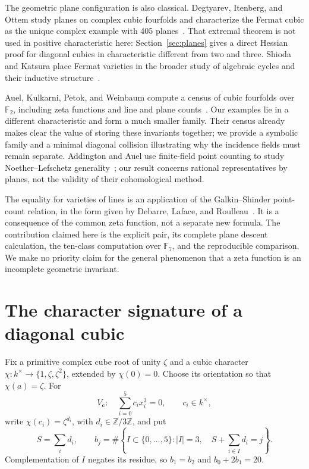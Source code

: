 \documentclass[11pt]{article}
\theoremstyle{remark}\newtheorem{remark}[theorem]{Remark}
\newcommand{\F}{\mathbb F}\newcommand{\PP}{\mathbb P}\newcommand{\Z}{\mathbb Z}
\begin{document}
The geometric plane configuration is also classical. Degtyarev, Itenberg, and Ottem study planes on complex cubic fourfolds and characterize the Fermat cubic as the unique complex example with 405 planes~\cite{dio}. That extremal theorem is not used in positive characteristic here: Section~\ref{sec:planes} gives a direct Hessian proof for diagonal cubics in characteristic different from two and three. Shioda and Katsura place Fermat varieties in the broader study of algebraic cycles and their inductive structure~\cite{sk}.

Auel, Kulkarni, Petok, and Weinbaum compute a census of cubic fourfolds over $\F_2$, including zeta functions and line and plane counts~\cite{akpw}. Our examples lie in a different characteristic and form a much smaller family. Their census already makes clear the value of storing these invariants together; we provide a symbolic family and a minimal diagonal collision illustrating why the incidence fields must remain separate. Addington and Auel use finite-field point counting to study Noether--Lefschetz generality~\cite{aa}; our result concerns rational representatives by planes, not the validity of their cohomological method.

The equality for varieties of lines is an application of the Galkin--Shinder point-count relation, in the form given by Debarre, Laface, and Roulleau~\cite{dlr}. It is a consequence of the common zeta function, not a separate new formula. The contribution claimed here is the explicit pair, its complete plane descent calculation, the ten-class computation over $\F_7$, and the reproducible comparison. We make no priority claim for the general phenomenon that a zeta function is an incomplete geometric invariant.

\section{The character signature of a diagonal cubic}
Fix a primitive complex cube root of unity $\zeta$ and a cubic character $\chi:k^\times\to\{1,\zeta,\zeta^2\}$, extended by $\chi(0)=0$. Choose its orientation so that $\chi(a)=\zeta$. For
\[
V_{\boldsymbol c}:\quad \sum_{i=0}^5 c_i x_i^3=0,\qquad c_i\in k^\times,
\]
write $\chi(c_i)=\zeta^{d_i}$, with $d_i\in\Z/3\Z$, and put
\begin{equation}\label{eq:signature}
S=\sum_i d_i,\qquad b_j=\#\left\{I\subset\{0,\ldots,5\}:|I|=3,\quad S+\sum_{i\in I}d_i=j\right\}.
\end{equation}
Complementation of $I$ negates its residue, so $b_1=b_2$ and $b_0+2b_1=20$.
\end{document}
